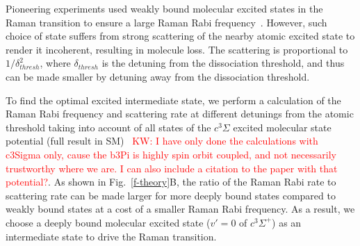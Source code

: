 \documentclass[aps,prl,twocolumn,groupedaddress]{revtex4-1}
\begin{document}
Pioneering experiments used weakly bound molecular excited states in the Raman transition to ensure a large Raman Rabi frequency~\cite{Wynar2000,Rom2004}. However, such choice of state suffers from strong scattering of the nearby atomic excited state to render it incoherent, resulting in molecule loss. The scattering  is  proportional to $1/\delta_{thresh}^2$, where $\delta_{thresh}$ is the detuning from the dissociation threshold, and thus can  be made smaller by detuning away from the dissociation threshold.




To find the optimal excited intermediate state, we perform a  calculation of the Raman Rabi frequency and scattering rate at different detunings from the atomic threshold taking into account of all states of the $c^3\Sigma$ excited molecular state potential (full result in SM)~\cite{Liu2017} \textcolor{red}{KW: I have only done the calculations with c3Sigma only, cause the b3Pi is highly spin orbit coupled, and not necessarily trustworthy where we are. I can also include a citation to the paper with that potential?}. As shown in Fig.~\ref{f-theory}B, the ratio of the Raman Rabi rate to scattering rate can be made larger for more deeply bound states compared to weakly bound states at a cost of a smaller Raman Rabi frequency.  %
As a result, we choose a deeply bound molecular excited state ($v'=0$ of $c^3\Sigma^+$) as an intermediate state to drive the Raman transition. %
\end{document}
